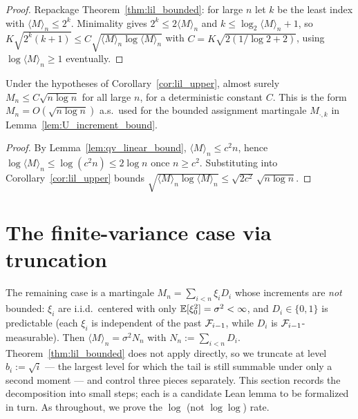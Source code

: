\begin{proof}
Repackage Theorem~\ref{thm:lil_bounded}: for large $n$ let $k$ be the least index with
$\langle M\rangle_n\le 2^k$. Minimality gives $2^k\le 2\langle M\rangle_n$ and
$k\le\log_2\langle M\rangle_n+1$, so
$K\sqrt{2^k(k+1)}\le C\sqrt{\langle M\rangle_n\log\langle M\rangle_n}$ with
$C=K\sqrt{2(1/\log 2+2)}$, using $\log\langle M\rangle_n\ge1$ eventually.
\end{proof}

\begin{corollary}\label{cor:lil_upper_nat}
Under the hypotheses of Corollary~\ref{cor:lil_upper}, almost surely
$M_n \le C\sqrt{n\log n}$ for all large $n$, for a deterministic constant $C$. This is the form
$M_n = O(\sqrt{n\log n})$ a.s.\ used for the bounded assignment martingale
$M_{\cdot,k}$ in Lemma~\ref{lem:U_increment_bound}.
\end{corollary}

\begin{proof}
By Lemma~\ref{lem:qv_linear_bound}, $\langle M\rangle_n\le c^2 n$, hence
$\log\langle M\rangle_n\le\log(c^2 n)\le 2\log n$ once $n\ge c^2$. Substituting into
Corollary~\ref{cor:lil_upper} bounds $\sqrt{\langle M\rangle_n\log\langle M\rangle_n}
\le\sqrt{2c^2}\,\sqrt{n\log n}$.
\end{proof}

\section{The finite-variance case via truncation}
\label{sec:pre_lil_trunc}

The remaining case is a martingale $M_n = \sum_{i<n}\xi_i D_i$ whose increments are
\emph{not} bounded: $\xi_i$ are i.i.d.\ centered with only $\mathbb{E}[\xi_0^2]=\sigma^2<\infty$,
and $D_i\in\{0,1\}$ is predictable (each $\xi_i$ is independent of the past $\mathcal{F}_{i-1}$,
while $D_i$ is $\mathcal{F}_{i-1}$-measurable). Then $\langle M\rangle_n=\sigma^2 N_n$ with
$N_n:=\sum_{i<n}D_i$. Theorem~\ref{thm:lil_bounded} does not apply directly, so we
truncate at level $b_i:=\sqrt{i}$ --- the largest level for which the tail is still
summable under only a second moment --- and control three pieces separately. This section
records the decomposition into small steps; each is a candidate Lean lemma to be formalized
in turn. As throughout, we prove the $\log$ (not $\log\log$) rate.

